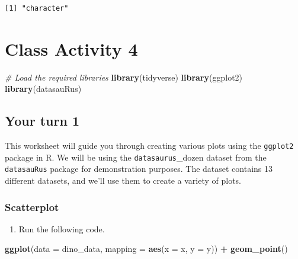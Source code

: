 \documentclass[
]{book}
\newenvironment{Shaded}{\begin{snugshade}}{\end{snugshade}}
\newcommand{\AttributeTok}[1]{\textcolor[rgb]{0.13,0.29,0.53}{#1}}
\newcommand{\CommentTok}[1]{\textcolor[rgb]{0.56,0.35,0.01}{\textit{#1}}}
\newcommand{\FunctionTok}[1]{\textcolor[rgb]{0.13,0.29,0.53}{\textbf{#1}}}
\newcommand{\NormalTok}[1]{#1}
\newcommand{\SpecialCharTok}[1]{\textcolor[rgb]{0.81,0.36,0.00}{\textbf{#1}}}
\providecommand{\tightlist}{%
  \setlength{\itemsep}{0pt}\setlength{\parskip}{0pt}}
\begin{document}
\begin{verbatim}
[1] "character"
\end{verbatim}

\hypertarget{class-activity-4}{%
\chapter{Class Activity 4}\label{class-activity-4}}

\begin{Shaded}
\begin{Highlighting}[]
\CommentTok{\# Load the required libraries}
\FunctionTok{library}\NormalTok{(tidyverse)}
\FunctionTok{library}\NormalTok{(ggplot2)}
\FunctionTok{library}\NormalTok{(datasauRus)}
\end{Highlighting}
\end{Shaded}

\hypertarget{your-turn-1}{%
\section{Your turn 1}\label{your-turn-1}}

This worksheet will guide you through creating various plots using the \texttt{ggplot2} package in R. We will be using the \texttt{datasaurus}\_dozen dataset from the \texttt{datasauRus} package for demonstration purposes. The dataset contains 13 different datasets, and we'll use them to create a variety of plots.

\hypertarget{scatterplot}{%
\subsection{Scatterplot}\label{scatterplot}}

\begin{enumerate}
\def\labelenumi{\alph{enumi}.}
\tightlist
\item
  Run the following code.
\end{enumerate}

\begin{Shaded}
\begin{Highlighting}[]
\FunctionTok{ggplot}\NormalTok{(}\AttributeTok{data =}\NormalTok{ dino\_data, }\AttributeTok{mapping =} \FunctionTok{aes}\NormalTok{(}\AttributeTok{x =}\NormalTok{ x, }\AttributeTok{y =}\NormalTok{ y)) }\SpecialCharTok{+}
  \FunctionTok{geom\_point}\NormalTok{()}
\end{Highlighting}
\end{Shaded}
\end{document}
